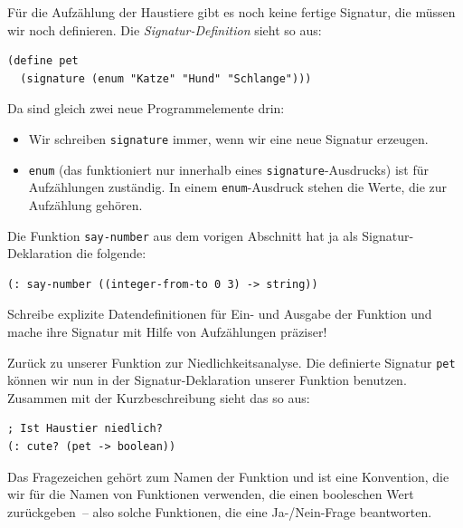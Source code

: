 Für die Aufzählung der Haustiere gibt es noch keine fertige Signatur,
die müssen wir noch definieren.  Die
\textit{Signatur-Definition} sieht so
aus:
\label{sec:pet}\label{page:signature}
%
\begin{lstlisting}
(define pet
  (signature (enum "Katze" "Hund" "Schlange")))
\end{lstlisting}
%
Da sind gleich zwei neue Programmelemente drin:
%
\begin{itemize}
\item Wir schreiben
  \lstinline{signature} immer, wenn wir eine
  neue Signatur erzeugen.
\item \lstinline{enum} (das funktioniert
  nur innerhalb eines \lstinline{signature}-Ausdrucks) ist für
  Aufzählungen zuständig.  In einem \lstinline{enum}-Ausdruck stehen
  die Werte, die zur Aufzählung gehören.
\end{itemize}
%
\begin{aufgabeinline}
  Die Funktion \lstinline{say-number} aus dem vorigen Abschnitt hat ja als
  Signatur-Deklaration die folgende:
\begin{lstlisting}
(: say-number ((integer-from-to 0 3) -> string))
\end{lstlisting}
  Schreibe explizite Datendefinitionen für Ein- und Ausgabe der Funktion
  und mache ihre Signatur mit Hilfe von Aufzählungen präziser!
\end{aufgabeinline}
%
Zurück zu unserer Funktion zur Niedlichkeitsanalyse.  Die definierte
Signatur \lstinline{pet} können wir nun in der Signatur-Deklaration
unserer Funktion benutzen.  Zusammen mit der Kurzbeschreibung sieht
das so aus:
%
\begin{lstlisting}
; Ist Haustier niedlich?
(: cute? (pet -> boolean))
\end{lstlisting}
%
Das Fragezeichen gehört zum Namen der Funktion und ist eine
Konvention, die wir für die Namen von Funktionen verwenden, die einen
booleschen Wert zurückgeben~-- also solche Funktionen, die eine
Ja-/Nein-Frage beantworten.

